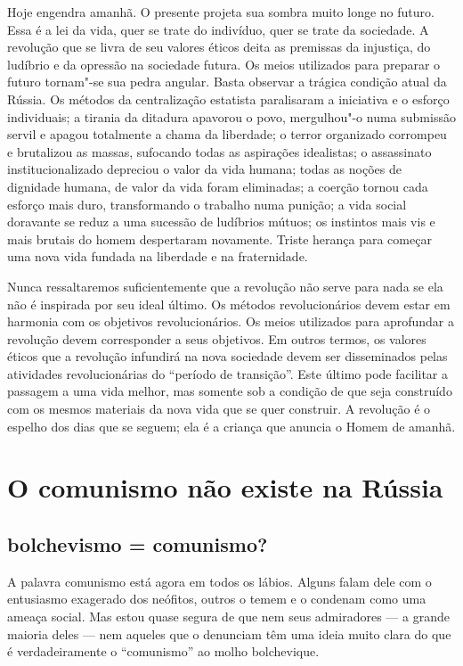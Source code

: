 Hoje engendra amanhã. O presente projeta sua sombra muito longe no
futuro. Essa é a lei da vida, quer se trate do indivíduo, quer se trate
da sociedade. A revolução que se livra de seu valores éticos deita as
premissas da injustiça, do ludíbrio e da opressão na sociedade futura.
Os meios utilizados para preparar o futuro tornam"-se sua pedra
angular. Basta observar a trágica condição atual da Rússia. Os métodos
da centralização estatista paralisaram a iniciativa e o esforço
individuais; a tirania da ditadura apavorou o povo, mergulhou"-o numa
submissão servil e apagou totalmente a chama da liberdade; o terror
organizado corrompeu e brutalizou as massas, sufocando todas as
aspirações idealistas; o assassinato institucionalizado depreciou o
valor da vida humana; todas as noções de dignidade humana, de valor da
vida foram eliminadas; a coerção tornou cada esforço mais duro,
transformando o trabalho numa punição; a vida social doravante se reduz
a uma sucessão de ludíbrios mútuos; os instintos mais vis e mais
brutais do homem despertaram novamente. Triste herança para começar uma
nova vida fundada na liberdade e na fraternidade.

Nunca ressaltaremos suficientemente que a revolução não serve para nada
se ela não é inspirada por seu ideal último. Os métodos revolucionários
devem estar em harmonia com os objetivos revolucionários. Os meios
utilizados para aprofundar a revolução devem corresponder a seus
objetivos. Em outros termos, os valores éticos que a revolução
infundirá na nova sociedade devem ser disseminados pelas atividades
revolucionárias do “período de transição”. Este último pode facilitar a
passagem a uma vida melhor, mas somente sob a condição de que seja
construído com os mesmos materiais da nova vida que se quer
construir. A revolução é o espelho dos dias que se seguem; ela é a
criança que anuncia o Homem de amanhã.

\chapter{O comunismo não existe na Rússia}

\vspace*{-.8em}

\section*{bolchevismo = comunismo?}
A palavra comunismo está agora em todos os lábios. Alguns falam dele com
o entusiasmo exagerado dos neófitos, outros o temem e o condenam como
uma ameaça social. Mas estou quase segura de que nem seus admiradores
--- a grande maioria deles --- nem aqueles que o denunciam têm uma ideia
muito clara do que é verdadeiramente o “comunismo” ao molho
bolchevique.

